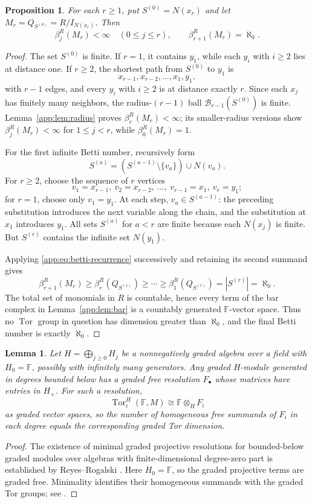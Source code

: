 \documentclass[11pt]{article}
\numberwithin{equation}{section}
\newtheorem{proposition}[theorem]{Proposition}
\newtheorem{lemma}[theorem]{Lemma}
\theoremstyle{definition}
\theoremstyle{remark}
\newcommand{\Tor}{\operatorname{Tor}}
\begin{document}
\begin{proposition}\label{app:prop:betti}
For each $r\ge1$, put $S^{(0)}=N(x_r)$ and let
$M_r=Q_{S^{(0)}}=R/I_{N(x_r)}$.  Then
\[
\beta_j^R(M_r)<\infty\quad(0\le j\le r),
\qquad
\beta_{r+1}^R(M_r)=\aleph_0.
\tag{10}\label{app:eq:example-betti}
\]
\end{proposition}
\begin{proof}
The set $S^{(0)}$ is finite.  If $r=1$, it contains $y_1$, while each $y_i$ with $i\ge2$ lies at distance one.  If $r\ge2$, the shortest path from $S^{(0)}$ to $y_1$ is
\[
x_{r-1},x_{r-2},\ldots,x_1,y_1,
\]
with $r-1$ edges, and every $y_i$ with $i\ge2$ is at distance exactly $r$.  Since each $x_j$ has finitely many neighbors, the radius-$(r-1)$ ball $\mathcal B_{r-1}(S^{(0)})$ is finite.  Lemma~\ref{app:lem:radius} proves $\beta_r^R(M_r)<\infty$; its smaller-radius versions show $\beta_j^R(M_r)<\infty$ for $1\le j<r$, while $\beta_0^R(M_r)=1$.

For the first infinite Betti number, recursively form
\[
S^{(a)}=(S^{(a-1)}\setminus\{v_a\})\cup N(v_a).
\]
For $r\ge2$, choose the sequence of $r$ vertices
\[
v_1=x_{r-1},\ v_2=x_{r-2},\ \ldots,\ v_{r-1}=x_1,\ v_r=y_1;
\]
for $r=1$, choose only $v_1=y_1$.  At each step, $v_a\in S^{(a-1)}$: the preceding substitution introduces the next variable along the chain, and the substitution at $x_1$ introduces $y_1$.  All sets $S^{(a)}$ for $a<r$ are finite because each $N(x_j)$ is finite.  But $S^{(r)}$ contains the infinite set $N(y_1)$.

Applying \eqref{app:eq:betti-recurrence} successively and retaining its second summand gives
\[
\beta_{r+1}^R(M_r)\ge\beta_r^R(Q_{S^{(1)}})\ge\cdots
\ge\beta_1^R(Q_{S^{(r)}})=|S^{(r)}|=\aleph_0.
\]
The total set of monomials in $R$ is countable, hence every term of the bar complex in Lemma~\ref{app:lem:bar} is a countably generated $\mathbb F$-vector space.  Thus no $\Tor$ group in question has dimension greater than $\aleph_0$, and the final Betti number is exactly $\aleph_0$.
\end{proof}

\begin{lemma}\label{app:lem:minimal}
Let $H=\bigoplus_{j\ge0}H_j$ be a nonnegatively graded algebra over a field with $H_0=\mathbb F$, possibly with infinitely many generators.  Any graded $H$-module generated in degrees bounded below has a graded free resolution $F_\bullet$ whose matrices have entries in $H_+$.  For such a resolution,
\[
\Tor_i^H(\mathbb F,M)\cong\mathbb F\otimes_HF_i
\]
as graded vector spaces, so the number of homogeneous free summands of $F_i$ in each degree equals the corresponding graded Tor dimension.
\end{lemma}
\begin{proof}
The existence of minimal graded projective resolutions for bounded-below
graded modules over algebras with finite-dimensional degree-zero part
is established by Reyes--Rogalski
\cite[Section~2.1, preceding Lemma~2.2]{ReyesRogalski}.
Here $H_0=\mathbb F$, so the graded projective terms are graded free.
Minimality identifies their homogeneous summands with the graded Tor
groups; see \cite[Lemma~2.6 and its proof]{ReyesRogalski}.
\end{proof}
\end{document}
